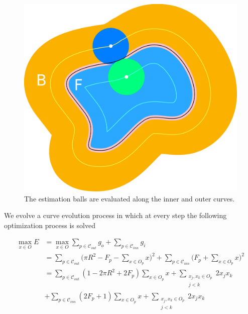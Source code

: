 \begin{figure}[h!]\label{fig:integral}
\center
\includegraphics[scale=0.25]{figures/chapter5/max-energy/integral-2.png}
\caption{The estimation balls are evaluated along the inner and outer curves.}
\end{figure}


We evolve a curve evolution process in which at every step the following optimization process is solved

\begin{align}\label{eq:max-energy}
	\max_{x \in O}{E} &= \max_{x \in O} \sum_{p \in \mathcal{C}_{out}}{g_o} + \sum_{p \in \mathcal{C}_{inn}}{g_i}\\\nonumber 
	&=\sum_{p \in \mathcal{C}_{out}}{ \big( \pi R^2 - F_p - \sum_{x \in O_p}{x}\big)^2} + \sum_{p \in \mathcal{C}_{inn}}{ \big( F_p + \sum_{x \in O_p}{x}\big)^2}\\\nonumber
	&= \sum_{p \in \mathcal{C}_{out}}{ (1 - 2\pi R^2 + 2F_p) \sum_{x \in O_p}{x} + \sum_{ \substack{ x_j,x_k \in O_p \\ j < k}}{2x_jx_k}}\\\nonumber
	&+ \sum_{p \in \mathcal{C}_{inn}}{(2F_p + 1)\sum_{x \in O_p}{x} + \sum_{\substack{ x_j,x_k \in O_p \\ j < k}}{2x_jx_k}}	
\end{align}
